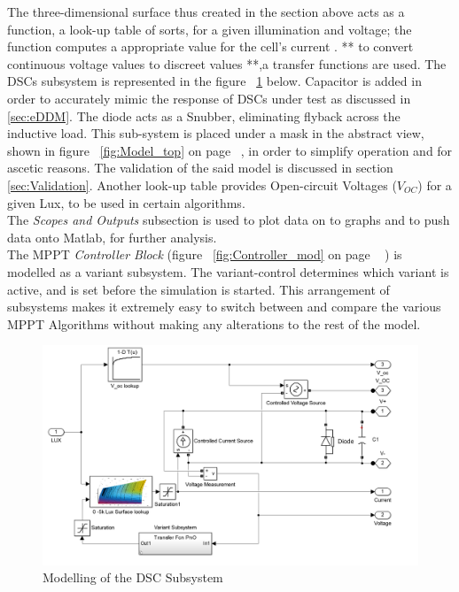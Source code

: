 The three-dimensional surface thus created in the section above acts as a function, a look-up table of sorts, for a given illumination and voltage; the function computes a appropriate value for the cell's current . ** to convert continuous voltage values to discreet values **,a transfer functions are used. The \ac{DSCs} subsystem is represented in the figure ~\ref{fig:PV_block_Model} below. Capacitor is added in order to accurately mimic the response of \ac{DSCs} under test as discussed in \ref{sec:eDDM}. The diode acts as a Snubber, eliminating flyback across the inductive load. This sub-system is placed under a mask in the abstract view, shown in figure ~\ref{fig:Model_top} on page ~\pageref{fig:Model_top}, in order to simplify operation and for ascetic reasons. The validation of the said model is discussed in section \ref{sec:Validation}. Another look-up table provides Open-circuit Voltages ($V_{OC}$) for a given Lux, to be used in certain algorithms. \\

The \textit{Scopes and Outputs} subsection is used to plot data on to graphs and to push data onto Matlab, for further analysis.\\

The \ac{MPPT} \textit{Controller Block} (figure ~\ref{fig:Controller_mod} on page ~\pageref{fig:Controller_mod} ) is modelled as a variant subsystem. The variant-control determines which variant is active, and is set before the simulation is started. This arrangement of subsystems makes it extremely easy to switch between and compare the various \ac{MPPT} Algorithms without making any alterations to the rest of the model.    

\begin{figure}[H]
	  \begin{center}
		  \includegraphics[width=\textwidth]{images/PV_block_Model}
		  \caption{Modelling of the DSC Subsystem }
		  \label{fig:PV_block_Model}
	  \end{center}
  \end{figure}

